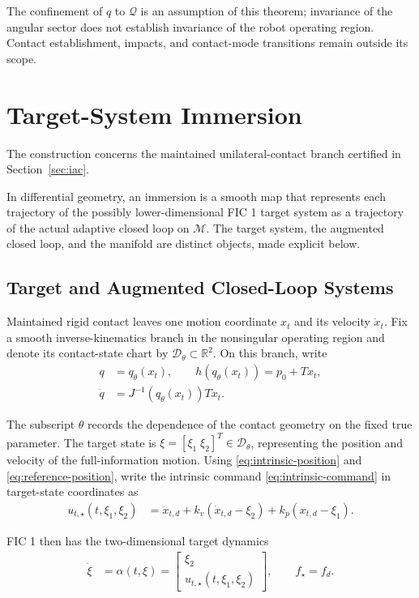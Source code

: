 \documentclass[10pt,journal,letterpaper]{IEEEtran}
\begin{document}
The confinement of $q$ to $\mathcal Q$ is an assumption of this theorem; invariance of the angular sector does not establish invariance of the robot operating region. Contact establishment, impacts, and contact-mode transitions remain outside its scope.

\appendices
\section{Target-System Immersion}\label{app:immersion}

The construction concerns the maintained unilateral-contact branch certified in Section~\ref{sec:iac}.

In differential geometry, an immersion is a smooth map that represents each trajectory of the possibly lower-dimensional FIC 1 target system as a trajectory of the actual adaptive closed loop on $\mathcal M$. The target system, the augmented closed loop, and the manifold are distinct objects, made explicit below.

\subsection{Target and Augmented Closed-Loop Systems}

Maintained rigid contact leaves one motion coordinate $x_t$ and its velocity $\dot x_t$. Fix a smooth inverse-kinematics branch in the nonsingular operating region and denote its contact-state chart by $\mathcal D_\theta\subset\mathbb R^2$. On this branch, write
\begin{align*}
q&=q_\theta(x_t),\qquad
h(q_\theta(x_t))=p_0+Tx_t,\\
\dot q&=J^{-1}(q_\theta(x_t))T\dot x_t.
\end{align*}

The subscript $\theta$ records the dependence of the contact geometry on the fixed true parameter. The target state is $\xi=[\xi_1\;\xi_2]^T\in\mathcal D_\theta$, representing the position and velocity of the full-information motion. Using \eqref{eq:intrinsic-position} and \eqref{eq:reference-position}, write the intrinsic command \eqref{eq:intrinsic-command} in target-state coordinates as
\begin{align*}
u_{t,\star}(t,\xi_1,\xi_2)
&=\ddot x_{t,d}+k_v(\dot x_{t,d}-\xi_2)
+k_p(x_{t,d}-\xi_1).
\end{align*}

FIC 1 then has the two-dimensional target dynamics
\begin{align*}
\dot\xi&=\alpha(t,\xi)
=\begin{bmatrix}
\xi_2\\
u_{t,\star}(t,\xi_1,\xi_2)
\end{bmatrix},\qquad f_\star=f_d.
\end{align*}
\end{document}
